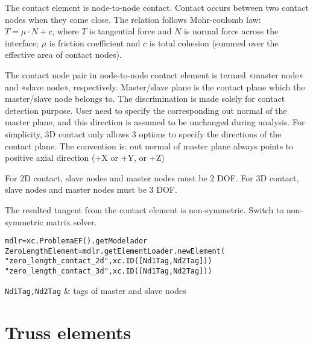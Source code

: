 The contact element is node-to-node contact. Contact occurs between two contact nodes when they come close. The relation follows Mohr-coulomb law: $T = \mu \cdot N + c$, where $T$ is tangential force and $N$ is normal force across the interface; $\mu$ is friction coefficient and $c$ is total cohesion (summed over the effective area of contact nodes).

The contact node pair in node-to-node contact element is termed «master node» and «slave node», respectively. Master/slave plane is the contact plane which the master/slave node belongs to. The discrimination is made solely for contact detection purpose. User need to specify the corresponding out normal of the master plane, and this direction is assumed to be unchanged during analysis. For simplicity, 3D contact only allows 3 options to specify the directions of the contact plane. The convention is: out normal of master plane always points to positive axial direction (+X or +Y, or +Z)

For 2D contact, slave nodes and master nodes must be 2 DOF. For 3D contact, slave nodes and master nodes must be 3 DOF.

The resulted tangent from the contact element is non-symmetric. Switch to non-symmetric matrix solver. 

\begin{verbatim}
mdlr=xc.ProblemaEF().getModelador
ZeroLengthElement=mdlr.getElementLoader.newElement(
"zero_length_contact_2d",xc.ID([Nd1Tag,Nd2Tag]))
"zero_length_contact_3d",xc.ID([Nd1Tag,Nd2Tag]))
\end{verbatim}
\begin{paramFuncTable}
{\tt Nd1Tag,Nd2Tag} & tags of master and slave nodes\\
\end{paramFuncTable}


\begin{paramClassTable}
\ElementParam{}
\ElementZERODParam{}
\end{paramClassTable}

\begin{methodsTable}
\ElementMeth{}
\ElementZERODMeth{}
\end{methodsTable}



\section{Truss elements}

